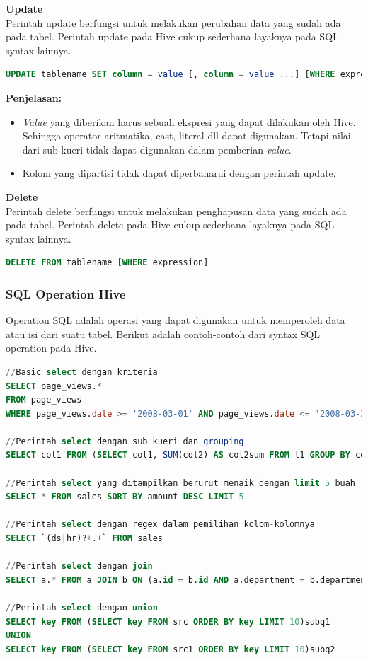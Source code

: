 


\textbf{Update}\\
Perintah update berfungsi untuk melakukan perubahan data yang sudah ada pada tabel. Perintah update pada Hive cukup sederhana layaknya pada SQL syntax lainnya. 

\begin{lstlisting}[language=sql,basicstyle=\tiny,caption=Syntax DML Update]
UPDATE tablename SET column = value [, column = value ...] [WHERE expression]
\end{lstlisting}

\textbf{Penjelasan:}
\begin{itemize}
	\item \textit{Value} yang diberikan harus sebuah ekspresi yang dapat dilakukan oleh Hive. Sehingga operator aritmatika, cast, literal dll dapat digunakan. Tetapi nilai dari sub kueri tidak dapat digunakan dalam pemberian \textit{value}.
	\item Kolom yang dipartisi tidak dapat diperbaharui dengan perintah update.
\end{itemize}

\textbf{Delete}\\
Perintah delete berfungsi untuk melakukan penghapusan data yang sudah ada pada tabel. Perintah delete pada Hive cukup sederhana layaknya pada SQL syntax lainnya. 

\begin{lstlisting}[language=sql,basicstyle=\tiny,caption=Syntax DML Delete]
DELETE FROM tablename [WHERE expression]
\end{lstlisting}

\subsubsection{SQL Operation Hive}
Operation SQL adalah operasi yang dapat digunakan untuk memperoleh data atau isi dari suatu tabel. Berikut adalah contoh-contoh dari syntax SQL operation pada Hive.

\begin{lstlisting}[language=sql,basicstyle=\tiny,caption=Syntax DML SQL Operation]
//Basic select dengan kriteria 
SELECT page_views.*
FROM page_views
WHERE page_views.date >= '2008-03-01' AND page_views.date <= '2008-03-31'

//Perintah select dengan sub kueri dan grouping
SELECT col1 FROM (SELECT col1, SUM(col2) AS col2sum FROM t1 GROUP BY col1) t2 WHERE t2.col2sum > 10

//Perintah select yang ditampilkan berurut menaik dengan limit 5 buah record
SELECT * FROM sales SORT BY amount DESC LIMIT 5

//Perintah select dengan regex dalam pemilihan kolom-kolomnya
SELECT `(ds|hr)?+.+` FROM sales

//Perintah select dengan join
SELECT a.* FROM a JOIN b ON (a.id = b.id AND a.department = b.department)

//Perintah select dengan union
SELECT key FROM (SELECT key FROM src ORDER BY key LIMIT 10)subq1
UNION
SELECT key FROM (SELECT key FROM src1 ORDER BY key LIMIT 10)subq2
\end{lstlisting}
	
